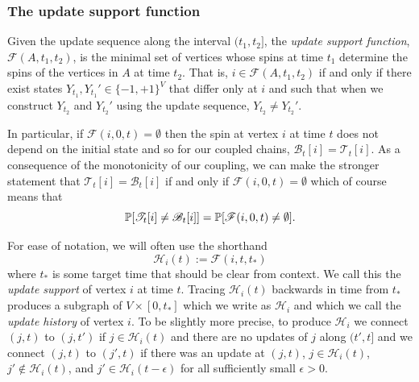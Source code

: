 	\subsubsection{The update support function}
	\label{sec: definition update support function}
	Given the update sequence along the interval $(t_1, t_2]$, the \emph{update support function}, $\mathscr{F}(A, t_1, t_2)$, is the minimal set of vertices whose spins at time $t_1$ determine the spins of the vertices in $A$ at time $t_2$. That is, $i \in \mathscr{F}(A, t_1, t_2)$ if and only if there exist states $Y_{t_1}, Y_{t_1}' \in \{-1, +1\}^{V}$ that differ only at $i$ and such that when we construct $Y_{t_2}$ and $Y_{t_2}'$ using the update sequence, $Y_{t_2} \neq Y_{t_2}'$.

	In particular, if $\mathscr{F}(i, 0, t) = \emptyset$ then the spin at vertex $i$ at time $t$ does not depend on the initial state and so for our coupled chains, $\mathscr{B}_t[i] = \mathscr{T}_t[i]$.
	As a consequence of the monotonicity of our coupling, we can make the stronger statement that $\mathscr{T}_t[i] = \mathscr{B}_t[i]$ if and only if $\mathscr{F}(i, 0, t) = \emptyset$ which of course means that
	\begin{equation}
	\label{eq:prob equality of coupling and empty support}
		\mathbb{P}[\mathscr{T}_t[i] \neq \mathscr{B}_t[i]] = \mathbb{P}[\mathscr{F}(i, 0, t) \neq \emptyset].
	\end{equation}

	For ease of notation, we will often use the shorthand
	\begin{equation}
		\mathcal{H}_i(t) := \mathscr{F}(i, t, t_*)
	\end{equation}
	where $t_*$ is some target time that should be clear from context. We call this the \emph{update support} of vertex $i$ at time $t$. Tracing $\mathcal{H}_i(t)$ backwards in time from $t_*$ produces a subgraph of $V \times [0, t_*]$ which we write as $\mathcal{H}_i$ and which we call the \emph{update history} of vertex $i$. To be slightly more precise, to produce $\mathcal{H}_i$ we connect $(j,t)$ to $(j,t')$ if $j \in \mathcal{H}_i(t)$ and there are no updates of $j$ along $(t', t]$ and we connect $(j,t)$ to $(j',t)$ if there was an update at $(j, t)$, $j \in \mathcal{H}_i(t)$, $j' \notin \mathcal{H}_i(t)$, and $j' \in \mathcal{H}_i(t-\epsilon)$ for all sufficiently small $\epsilon > 0$.


